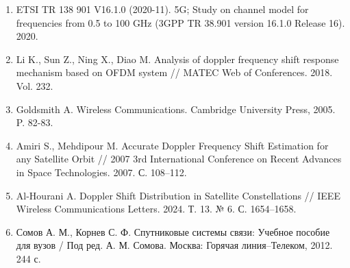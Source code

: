 \begin{enumerate}
    \item \label{ETSI38901}
    ETSI TR 138 901 V16.1.0 (2020-11). 5G; Study on channel model for frequencies from 0.5 to 100 GHz (3GPP TR 38.901 version 16.1.0 Release 16). 2020.

    \item \label{Li2018}
    Li K., Sun Z., Ning X., Diao M. Analysis of doppler frequency shift response mechanism based on OFDM system // MATEC Web of Conferences. 2018. Vol. 232.

    \item \label{Goldsmith2005} 
        Goldsmith A. Wireless Communications. Cambridge University Press, 2005. P. 82-83.

    \item \label{Amiri2007}
    Amiri S., Mehdipour M. Accurate Doppler Frequency Shift Estimation for any Satellite Orbit // 2007 3rd International Conference on Recent Advances in Space Technologies. 2007. С. 108–112.

    \item \label{AlHourani2024}
    Al-Hourani A. Doppler Shift Distribution in Satellite Constellations // IEEE Wireless Communications Letters. 2024. Т. 13. № 6. С. 1654–1658.

    \item \label{somov2012satellite}
    Сомов А. М., Корнев С. Ф. Спутниковые системы связи: Учебное пособие для вузов / Под ред. А. М. Сомова. Москва: Горячая линия–Телеком, 2012. 244 с.

%
%
%
%
\end{enumerate}



